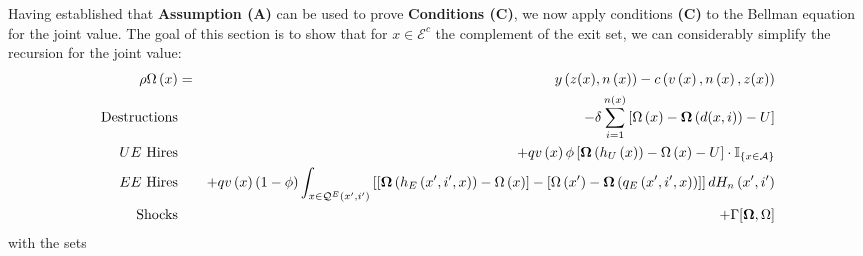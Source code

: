 Having established that \textbf{Assumption (A)} can be used to prove \textbf{%
Conditions (C)}, we now apply conditions \textbf{(C)} to the Bellman
equation for the joint value. The goal of this section is to show that for $x\in \mathcal{E}^c$ the complement of
the exit set, we can considerably simplify the recursion for the joint
value:
\begin{eqnarray}
\label{eq:JointValueArbitraryState}
\rho \Omega \left( x\right) &=&y\left( z(x),n\left( x\right) \right)
-c\left( v\left( x\right) ,n\left( x\right) ,z(x)\right) \nonumber \\
\text{Destructions} &&-\delta \sum\limits_{i=1}^{n\left( x\right) }\left[
\Omega \left( x\right) -\boldsymbol{\Omega }\left( d(x,i)\right) -U\right] \nonumber \\
\text{$UE$ Hires} &&+qv\left( x\right) \phi \left[ \boldsymbol{\Omega }\left(
h_{U}\left( x\right) \right) -\Omega \left( x\right) -U\right] \cdot \mathbb{%
I}_{\left\{ x\in \mathcal{A}\right\} } \nonumber \\
\text{$EE$ Hires} &&+qv\left( x\right) \left( 1-\phi \right) \int_{x\in
\mathcal{Q}^{E}\left( x^{\prime },i^{\prime }\right) }\left[ \left[ \boldsymbol{%
\Omega }\left( h_{E}\left( x^{\prime },i^{\prime },x\right) \right) -\Omega
\left( x\right) \right] -\left[ \Omega \left( x^{\prime }\right) -\boldsymbol{%
\Omega }\left( q_{E}\left( x^{\prime },i^{\prime },x\right) \right) \right] %
\right] dH_n\left( x^{\prime },i^{\prime }\right) \nonumber \\
\text{Shocks} &&+\Gamma[\boldsymbol{\Omega},\Omega]
\end{eqnarray}
with the sets

